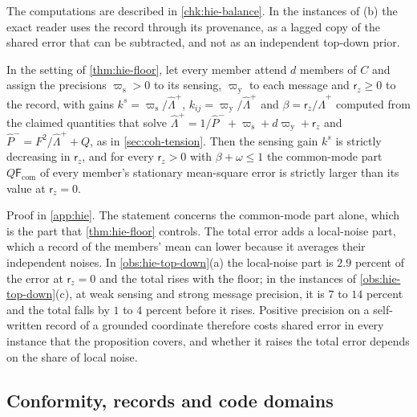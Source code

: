 The computations are described in \cref{chk:hie-balance}. In the instances of (b) the exact reader uses the record through its provenance, as a lagged copy of the shared error that can be subtracted, and not as an independent top-down prior.

\begin{proposition}\label{conj:hie-top-down}
In the setting of \cref{thm:hie-floor}, let every member attend $d$ members of $C$ and assign the precisions $\varpi_{\mathrm s}>0$ to its sensing, $\varpi_{\mathrm y}$ to each message and $\mathsf r_z\ge0$ to the record, with gains $k^s=\varpi_{\mathrm s}/\hat\Lambda^+$, $k_{ij}=\varpi_{\mathrm y}/\hat\Lambda^+$ and $\beta=\mathsf r_z/\hat\Lambda^+$ computed from the claimed quantities that solve $\hat\Lambda^+=1/\hat P^-+\varpi_{\mathrm s}+d\varpi_{\mathrm y}+\mathsf r_z$ and $\hat P^-=F^2/\hat\Lambda^++Q$, as in \cref{sec:coh-tension}. Then the sensing gain $k^s$ is strictly decreasing in $\mathsf r_z$, and for every $\mathsf r_z>0$ with $\beta+\omega\le1$ the common-mode part $Q\mathsf F_{\mathrm{com}}$ of every member's stationary mean-square error is strictly larger than its value at $\mathsf r_z=0$.
\end{proposition}

Proof in \cref{app:hie}. The statement concerns the common-mode part alone, which is the part that \cref{thm:hie-floor} controls. The total error adds a local-noise part, which a record of the members' mean can lower because it averages their independent noises. In \cref{obs:hie-top-down}(a) the local-noise part is $2.9$ percent of the error at $\mathsf r_z=0$ and the total rises with the floor; in the instances of \cref{obs:hie-top-down}(c), at weak sensing and strong message precision, it is $7$ to $14$ percent and the total falls by $1$ to $4$ percent before it rises. Positive precision on a self-written record of a grounded coordinate therefore costs shared error in every instance that the proposition covers, and whether it raises the total error depends on the share of local noise.

\subsection{Conformity, records and code domains}\label{sup:hie-conformity-records-and-code-domains}

